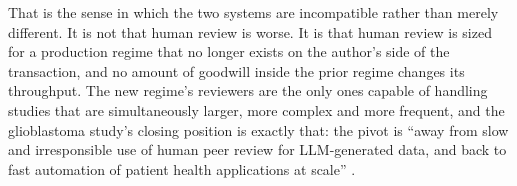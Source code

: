 That is the sense in which the two systems are incompatible rather than merely
different. It is not that human review is worse. It is that human review is
sized for a production regime that no longer exists on the author's side of the
transaction, and no amount of goodwill inside the prior regime changes its
throughput. The new regime's reviewers are the only ones capable of handling
studies that are simultaneously larger, more complex and more frequent, and the
glioblastoma study's closing position is exactly that: the pivot is ``away from
slow and irresponsible use of human peer review for LLM-generated data, and back
to fast automation of patient health applications at scale''
\cite{aiprgliomatc}.
